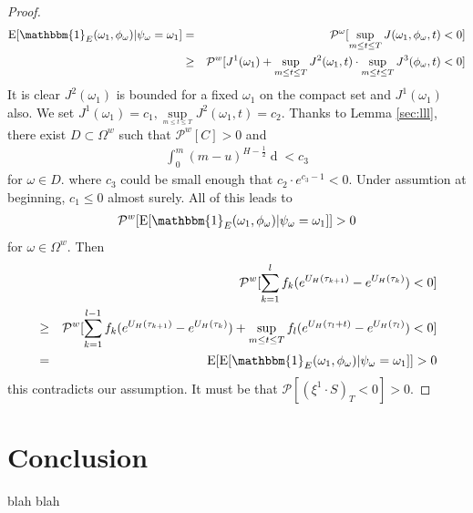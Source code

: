 \documentclass[a4paper, twoside, 11pt]{article}
\theoremstyle{definition}
\begin{document}
\begin{proof}
\begin{eqnarray*}
  \mathrm{E} [\mathbbm{1}_{E}(\omega_1, \phi_{\omega})| \psi_{\omega}=\omega_1] &=& \mathcal{P^{\omega}}[\sup\limits_{m\le t \le T} J(\omega_1, \phi_{\omega}, t) < 0] \\
  &\ge& \mathcal{P}^w[J^1(\omega_1) + \sup\limits_{m\le t \le T}J^2(\omega_1, t) \cdot \sup\limits_{m\le t \le T}J^3(\phi_{\omega}, t) < 0]
\end{eqnarray*}
It is clear $J^2(\omega_1)$ is bounded for a fixed $\omega_1$ on the compact set and $J^1(\omega_1)$ also. We set $J^1(\omega_1) = c_1 , \sup\limits_{_{m\le t \le T}}J^2(\omega_1, t) = c_2$. Thanks to Lemma \ref{sec:lll}, there exist $D \subset \Omega^{w} $  such that $\mathcal{P}^{w}[C] >0$ and 
\begin{eqnarray*}
  \int_0^{m}(m-u)^{H-\frac{1}{2}}\mathop{d \phi_{\omega}(u)} < c_3 
\end{eqnarray*}
for $\omega \in D$.
where $c_3$ could be small enough that $c_2 \cdot e^{c_3 - 1} < 0 $. Under assumtion at beginning, $c_1 \le 0$ almost surely. All of this leads to 
\begin{eqnarray*}
  \mathcal{P}^w[ \mathrm{E} [\mathbbm{1}_{E}(\omega_1, \phi_{\omega})| \psi_{\omega}=\omega_1]] > 0
\end{eqnarray*}
for $\omega \in \Omega^w$.
Then
\begin{eqnarray*}
  &&\mathcal{P}^w[\sum_{k=1}^{l} f_k (e^{U_H(\tau_{k+1})} - e^{U_H(\tau_k)}) < 0] \\
&\ge&\mathcal{P}^w[\sum_{k=1}^{l-1} f_k (e^{U_H(\tau_{k+1})}  - e^{U_H(\tau_{k})}) +  \sup\limits_{m\le t \le T}f_l(e^{U_H(\tau_l+t)}-e^{U_H(\tau_l)})  < 0]\\
&=& \mathrm{E}[ \mathrm{E} [\mathbbm{1}_{E}(\omega_1, \phi_{\omega})| \psi_{\omega}=\omega_1]] > 0
\end{eqnarray*}
this contradicts our assumption. It must be that ${\mathcal{P}}[(\xi^1 \cdot S)_T < 0] > 0$.

\end{proof}

\newpage

\section{Conclusion}

blah
\newpage
blah
\newpage
\end{document}
